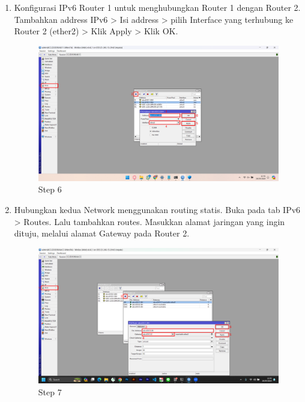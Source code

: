 \begin{center}
\begin{enumerate}
        \item Konfigurasi IPv6 Router 1 untuk menghubungkan Router 1 dengan Router 2. Tambahkan address IPv6 > Isi address > pilih Interface yang terhubung ke Router 2 (ether2) > Klik Apply > Klik OK.
        \begin{figure}[H]
			\centering
			\includegraphics[width=0.8\linewidth]{P5/img/pc1/Step 6.png}
			\caption{Step 6}
			\label{fig:Step 6(PC 1)}
		\end{figure}

        \item Hubungkan kedua Network menggunakan routing statis. Buka pada tab IPv6 > Routes. Lalu tambahkan routes. Masukkan alamat jaringan yang ingin dituju, melalui alamat Gateway pada Router 2.
        \begin{figure}[H]
			\centering
			\includegraphics[width=0.8\linewidth]{P5/img/pc1/Step 7.png}
			\caption{Step 7}
			\label{fig:Step 7(PC 1)}
		\end{figure}
    \end{enumerate}


\end{center}
